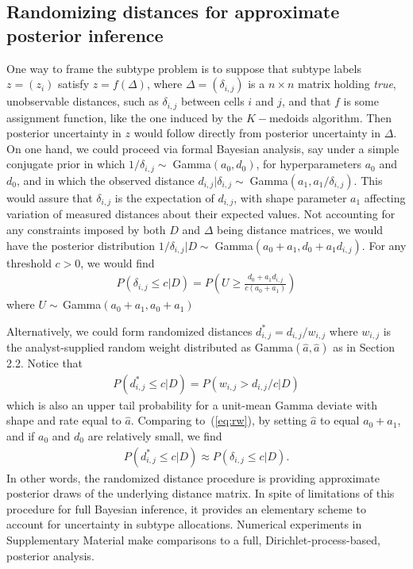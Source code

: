 \documentclass[aoas,preprint]{imsart}
\begin{document}
\subsection*{Randomizing distances for approximate posterior inference}

One way to frame the subtype problem is to suppose that subtype labels $z = (z_i)$ satisfy
 $z=f(\Delta)$, where $\Delta = \left( \delta_{i,j} \right)$ is
a $n \times n$  matrix holding {\em true}, unobservable distances, such as  $\delta_{i,j}$ between cells $i$ and $j$, 
and that $f$ is some assignment
function, like the one 
induced by the $K-$medoids algorithm.  Then posterior uncertainty in $z$ would follow 
directly from  posterior uncertainty in $\Delta$.  On one hand, 
we could proceed via formal Bayesian analysis, say under
a simple conjugate prior in which $1/\delta_{i,j} \sim \; $Gamma$(a_0,d_0)$, for hyperparameters
$a_0$ and $d_0$, and in which the observed distance
$d_{i,j} | \delta_{i,j} \sim \; $Gamma$(a_1, a_1/\delta_{i,j})$.  This would assure that $\delta_{i,j}$ is
the expectation of $d_{i,j}$, with shape  parameter $a_1$ affecting variation of measured distances
about their expected values.  Not accounting
for any constraints imposed by both $D$ and $\Delta$ being distance matrices, we would have the 
posterior distribution $1/\delta_{i,j} | D \sim \; $Gamma$(a_0+a_1,  d_0 + a_1 d_{i,j} )$.  For any threshold
$c>0$, we would find
\begin{eqnarray}
\label{eq:rw}
P\left( \delta_{i,j} \leq c | D \right) = P\left( U \geq  \frac{  d_0+a_1 d_{i,j}}{c(a_0+a_1)} \right)
\end{eqnarray}
where $U \sim \, $Gamma$(a_0+a_1, a_0+a_1)$

Alternatively, we could form randomized distances $d^*_{i,j} = d_{i,j}/w_{i,j}$ where $w_{i,j}$ is 
the analyst-supplied random weight distributed as Gamma$(\hat a , \hat a)$ as in Section 2.2.  Notice
that 
\begin{eqnarray*}
P( d_{i,j}^* \leq c | D )  = P( w_{i,j} > d_{i,j}/c | D)
\end{eqnarray*}
which is also an upper tail probability for a unit-mean Gamma deviate with shape and rate equal to $\hat a$.  
Comparing to~(\ref{eq:rw}),  by setting  $\hat a$ to equal $a_0 + a_1$, and if $a_0$ and $d_0$ are relatively
small, we find
\begin{eqnarray*}
P( d_{i,j}^* \leq c | D )  \approx  P( \delta_{i,j} \leq c | D).
\end{eqnarray*}
In other words, the randomized distance procedure is providing approximate posterior draws of the underlying
distance matrix.  In spite of limitations of this procedure for full Bayesian inference, it provides
an elementary scheme to account for uncertainty in subtype allocations.  Numerical experiments
in Supplementary Material make comparisons to a full, Dirichlet-process-based, posterior analysis.
\end{document}
